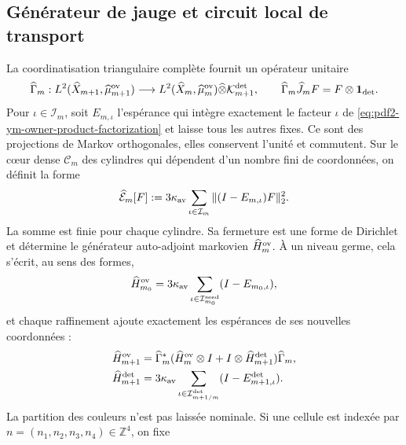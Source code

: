 \subsection{Générateur de jauge et circuit local de transport}

La coordinatisation triangulaire complète fournit un opérateur unitaire
\begin{equation}\label{eq:pdf2-ym-owner-triangular-unitary}
 \widehat\Gamma_m:
 L^2(\widehat X_{m+1},\widehat\mu_{m+1}^{\rm ov})
 \longrightarrow
 L^2(\widehat X_m,\widehat\mu_m^{\rm ov})
 \widehat\otimes\mathcal K_{m+1}^{\rm det},
 \qquad
 \widehat\Gamma_m\widehat J_mF=F\otimes\mathbf1_{\rm det}.
\end{equation}
Pour $\iota\in\mathcal I_m$, soit $E_{m,\iota}$ l'espérance qui intègre exactement le facteur $\iota$ de \eqref{eq:pdf2-ym-owner-product-factorization} et laisse tous les autres fixes. Ce sont des projections de Markov orthogonales, elles conservent l'unité et commutent. Sur le cœur dense $\mathscr C_m$ des cylindres qui dépendent d'un nombre fini de coordonnées, on définit la forme
\begin{equation}\label{eq:pdf2-ym-owner-full-form}
 \widehat{\mathcal E}_m[F]
 :=3\kappa_{\rm av}\sum_{\iota\in\mathcal I_m}
   \|(I-E_{m,\iota})F\|_2^2.
\end{equation}
La somme est finie pour chaque cylindre. Sa fermeture est une forme de Dirichlet et
détermine le générateur auto-adjoint markovien
$\widehat H_m^{\rm ov}$. À un niveau germe, cela s’écrit, au sens des
formes,
\begin{equation}\label{eq:pdf2-ym-owner-base-generator}
 \widehat H_{m_0}^{\rm ov}
 =3\kappa_{\rm av}
  \sum_{\iota\in\mathcal I_{m_0}^{\rm seed}}(I-E_{m_0,\iota}),
\end{equation}
et chaque raffinement ajoute exactement les espérances de ses nouvelles coordonnées :
\begin{equation}\label{eq:pdf2-ym-owner-refined-generator}
 \begin{aligned}
 \widehat H_{m+1}^{\rm ov}
 &=\widehat\Gamma_m^*
   (\widehat H_m^{\rm ov}\otimes I
    +I\otimes\widehat H_{m+1}^{\rm det})\widehat\Gamma_m,\\
 \widehat H_{m+1}^{\rm det}
 &=3\kappa_{\rm av}
   \sum_{\iota\in\mathcal I_{m+1/m}^{\rm det}}
   (I-E_{m+1,\iota}^{\rm det}).
 \end{aligned}
\end{equation}
La partition des couleurs n’est pas laissée nominale. Si une cellule est indexée par
$n=(n_1,n_2,n_3,n_4)\in\mathbb Z^4$, on fixe

